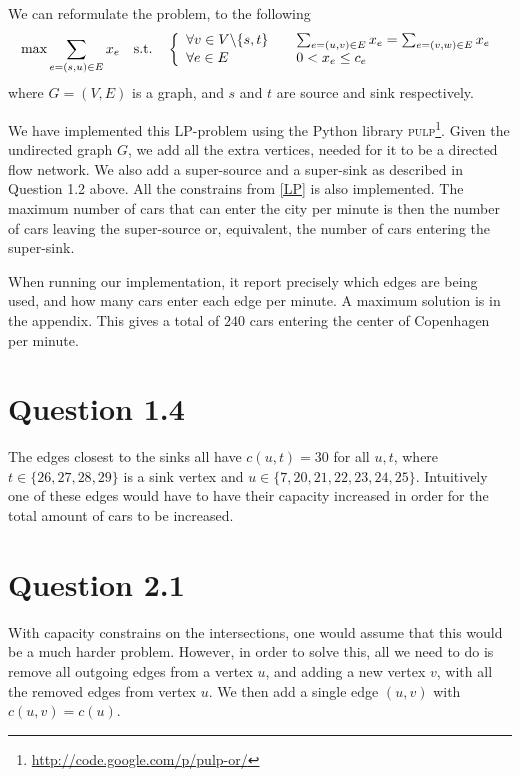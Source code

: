 \documentclass[10pt]{article}
\begin{document}
We can reformulate the problem, to the following
\begin{equation}
	\text{max} \sum_{e=(s,u) \in E} x_e \quad \text{s.t.} \quad \left\{
	\begin{array}{l l}
		\forall v \in V\backslash\{s,t\} & \quad \sum_{e=(u,v) \in E} x_e = \sum_{e=(v,w) \in E} x_e \\
		\forall e \in E & \quad 0 < x_e \leq c_e
	\end{array} \right. \label{LP}
\end{equation}
where $G = (V, E)$ is a graph, and $s$ and $t$ are source and sink respectively.

We have implemented this LP-problem using the Python library \textsc{pulp}\footnote{\url{http://code.google.com/p/pulp-or/}}.
Given the undirected graph $G$, we add all the extra vertices, needed for it to be a directed flow network.
We also add a super-source and a super-sink as described in Question 1.2 above.
All the constrains from \eqref{LP} is also implemented.
The maximum number of cars that can enter the city per minute is then the number of cars leaving the super-source or, equivalent, the number of cars entering the super-sink.

When running our implementation, it report precisely which edges are being used, and how many cars enter each edge per minute.
A maximum solution is in the appendix.
This gives a total of $240$ cars entering the center of Copenhagen per minute. 


\section*{Question 1.4} %
\label{sec:question_1_4}
The edges closest to the sinks all have $c(u,t) = 30$ for all $u,t$, where $t \in \{26, 27, 28, 29\}$ is a sink vertex and $u \in \{7, 20, 21, 22, 23, 24, 25\}$. 
Intuitively one of these edges would have to have their capacity increased in order for the total amount of cars to be increased.


\section*{Question 2.1} %
\label{sec:question_2_1}
With capacity constrains on the intersections, one would assume that this would be a much harder problem.
However, in order to solve this, all we need to do is remove all outgoing edges from a vertex $u$, and adding a new vertex $v$, with all the removed edges from vertex $u$.
We then add a single edge $(u,v)$ with $c(u, v) = c(u)$.
\end{document}
